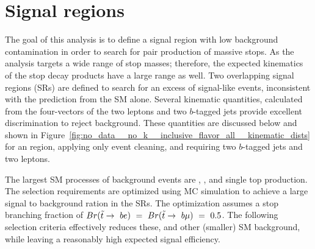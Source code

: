 \FloatBarrier
\section{Signal regions}
\label{sec:signal_regions}

The goal of this analysis is to define a signal region with low background
contamination in order to search for pair production of massive stops.
As the analysis targets a wide range of stop masses; therefore, the expected
kinematics of the stop decay products have a large range as well.
Two overlapping signal regions (SRs) are defined to search for an excess of
signal-like events, inconsistent with the prediction from the SM alone.
Several kinematic quantities, calculated from the four-vectors of the two
leptons and two $b$-tagged jets provide excellent discrimination to reject
background. 
These quantities are discussed below and shown in
Figure~\ref{fig:no_data__no_k__inclusive_flavor_all__kinematic_dists} for an
region, applying only event cleaning, and requiring two $b$-tagged jets and
two leptons.

The largest SM processes of background events are \ZGAMMAJETS, \TTBAR, and
single top production.
The selection requirements are optimized using MC simulation to achieve a
large signal to background ration in the SRs.
The optimization assumes a stop branching fraction of
$Br(\tilde{t}\rightarrow~be)~=~Br(\tilde{t}\rightarrow~b\mu)~=~0.5$.
The following selection criteria effectively reduces these, and other
(smaller) SM background, while leaving a reasonably high expected signal
efficiency.

